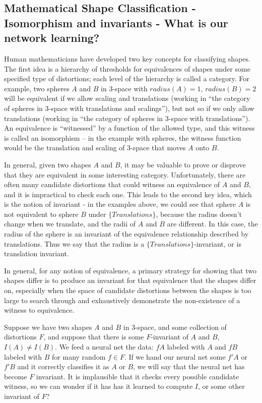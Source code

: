 \documentclass{article}
\begin{document}
\subsection{Mathematical Shape Classification - Isomorphism and invariants - What is our network learning?}

Human mathematicians have developed two key concepts for classifying shapes. The first idea is a hierarchy of thresholds for equivalences of shapes under some specified type of distortions; each level of the hierarchy is called a category. For example, two spheres $A$ and $B$ in 3-space with $radius(A) = 1$, $radius(B) = 2$ will be equivalent if we allow scaling and translations (working in ``the category of spheres in 3-space with translations and scalings''), but not so if we only allow translations (working in ``the category of spheres in 3-space with translations'').  An equivalence is ``witnessed'' by a function of the allowed type, and this witness is called an isomorphism -- in the example with spheres, the witness function would be the translation and scaling of 3-space that moves $A$ onto $B$.

In general, given two shapes $A$ and $B$, it may be valuable to prove or disprove that they are equivalent in some interesting category. Unfortunately, there are often many candidate distortions that could witness an equivalence of $A$ and $B$, and it is impractical to check each one. This leads to the second key idea, which is the notion of invariant - in the examples above, we could see that sphere $A$ is not equivalent to sphere $B$ under $\{Translations\}$, because the radius doesn't change when we translate, and the radii of $A$ and $B$ are different. In this case, the radius of the sphere is an invariant of the equivalence relationship described by translations. Thus we say that the radius is a $\{Translations\}$-invariant, or is translation invariant.

In general, for any notion of equivalence, a primary strategy for showing that two shapes differ is to produce an invariant for that equivalence that the shapes differ on, especially when the space of candidate distortions between the shapes is too large to search through and exhaustively demonstrate the non-existence of a witness to equivalence.

Suppose we have two shapes $A$ and $B$ in 3-space, and some collection of distortions $F$, and suppose that there is some $F$-invariant of $A$ and $B$, $I(A) \not = I(B)$. We feed a neural net the data: $fA$ labeled with $A$ and $fB$ labeled with $B$ for many random $f \in F$. If we hand our neural net some $f'A$ or $f'B$ and it correctly classifies it as $A$ or $B$, we will say that the neural net has become $F$ invariant. It is implausible that it checks every possible candidate witness, so we can wonder if it has has it learned to compute $I$, or some other invariant of $F$?
\end{document}
